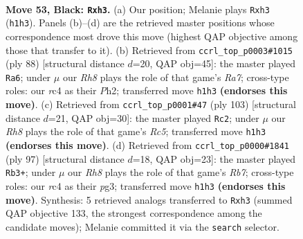 \documentclass[11pt]{article}
\begin{document}
\clearpage

\begin{figure}[p]\centering
\begin{subfigure}{0.46\textwidth}\centering
\resizebox{\linewidth}{!}{%
\newchessgame
\chessboard[
  setfen={8/R4p2/4pk2/p7/P1R1P3/5P1P/4K3/7r b - - 3 53},
  showmover=false,
  pgfstyle=straightmove, color=movearrow, markmove={h1-h3}
]}
\caption{}
\end{subfigure}\hfill
\begin{subfigure}{0.46\textwidth}\centering
\resizebox{\linewidth}{!}{%
\newchessgame
\chessboard[
  setfen={5k2/R6p/1p4p1/1P6/5PK1/pr4P1/7P/8 w - - 0 45},
  showmover=false,
  pgfstyle=straightmove, color=movearrow, markmove={a7-a6}
]}
\caption{}
\end{subfigure}
\\[4pt]
\begin{subfigure}{0.46\textwidth}\centering
\resizebox{\linewidth}{!}{%
\newchessgame
\chessboard[
  setfen={8/5p2/5k2/R5p1/P1r4p/5P2/6PK/8 b - - 1 52},
  showmover=false,
  pgfstyle=straightmove, color=movearrow, markmove={c4-c2}
]}
\caption{}
\end{subfigure}\hfill
\begin{subfigure}{0.46\textwidth}\centering
\resizebox{\linewidth}{!}{%
\newchessgame
\chessboard[
  setfen={8/5pkp/4p3/4P2p/3P1R2/3K2P1/1r3P2/8 b - - 19 49},
  showmover=false,
  pgfstyle=straightmove, color=movearrow, markmove={b2-b3}
]}
\caption{}
\end{subfigure}
\caption{\textbf{Move 53, Black: \texttt{Rxh3}.} (a) Our position; Melanie plays \texttt{Rxh3} (\texttt{h1h3}). Panels (b)--(d) are the retrieved master positions whose correspondence most drove this move (highest QAP objective among those that transfer to it). (b) Retrieved from \texttt{ccrl\_top\_p0003\#1015} (ply 88) [structural distance $d$=20, QAP obj=45]: the master played \texttt{Ra6}; under $\mu$ our \emph{Rh8} plays the role of that game's \emph{Ra7}; cross-type roles: our \emph{r}c4 as their \emph{P}h2; transferred move \texttt{h1h3} \textbf{(endorses this move)}. (c) Retrieved from \texttt{ccrl\_top\_p0001\#47} (ply 103) [structural distance $d$=21, QAP obj=30]: the master played \texttt{Rc2}; under $\mu$ our \emph{Rh8} plays the role of that game's \emph{Rc5}; transferred move \texttt{h1h3} \textbf{(endorses this move)}. (d) Retrieved from \texttt{ccrl\_top\_p0000\#1841} (ply 97) [structural distance $d$=18, QAP obj=23]: the master played \texttt{Rb3+}; under $\mu$ our \emph{Rh8} plays the role of that game's \emph{Rb7}; cross-type roles: our \emph{r}c4 as their \emph{p}g3; transferred move \texttt{h1h3} \textbf{(endorses this move)}. Synthesis: 5 retrieved analogs transferred to \texttt{Rxh3} (summed QAP objective 133, the strongest correspondence among the candidate moves); Melanie committed it via the \texttt{search} selector.}
\label{fig:thought-m105}
\end{figure}
\end{document}

